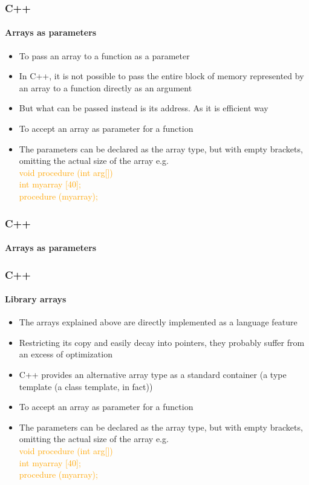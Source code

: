 \documentclass[hyperref={pdfpagelabels=true}]{beamer}
\begin{document}
\begin{frame}[shrink]
\frametitle{C++}
\framesubtitle{Arrays as parameters}
\begin{itemize}[<+->]
\item To pass an array to a function as a parameter
\item In C++, it is not possible to pass the entire block of memory represented by an array to a function directly as an argument
\item But what can be passed instead is its address. As it is efficient way
\item To accept an array as parameter for a function 
\item The parameters can be declared as the array type, but with empty brackets, omitting the actual size of the array e.g. \\ \textcolor{orange}{void procedure (int arg[])
\\ int myarray [40]; \\procedure (myarray);}

\end{itemize}
\end{frame}


\begin{frame}
\frametitle{C++}
\framesubtitle{Arrays as parameters}
\begin{tcolorbox}[title= ,width=11.85 cm]

\end{tcolorbox}
\end{frame}


\begin{frame}
\frametitle{C++}
\framesubtitle{Library arrays}
\begin{itemize}[<+->]
\item The arrays explained above are directly implemented as a language feature
\item Restricting its copy and easily decay into pointers, they probably suffer from an excess of optimization
\item C++ provides an alternative array type as a standard container (a type template (a class template, in fact))
\item To accept an array as parameter for a function 
\item The parameters can be declared as the array type, but with empty brackets, omitting the actual size of the array e.g. \\ \textcolor{orange}{void procedure (int arg[])
\\ int myarray [40]; \\procedure (myarray);}
\end{itemize}
\end{frame}
\end{document}
